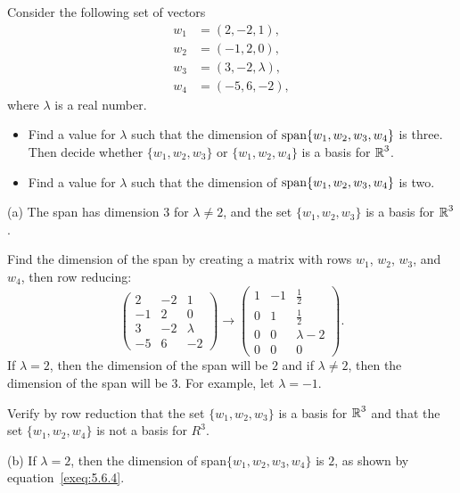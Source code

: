 \documentclass{ximera}
\begin{document}
\begin{exercise} \label{c5.6.4}
Consider the following set of vectors
\begin{align*}
w_1 &= (2, -2, 1), \\
w_2 &= (-1, 2, 0), \\
w_3 &= (3, -2, \lambda), \\
w_4 &= (-5, 6, -2),
\end{align*}
where $\lambda$ is a real number.
\begin{itemize}
\item[(a)] Find a value for $\lambda$ such that the
dimension of ${\rm span}\{w_1,w_2,w_3,w_4\}$ is three. Then decide
whether $\{w_1,w_2,w_3\}$ or $\{w_1,w_2,w_4\}$ is a basis for
$\mbox{$\Bbb{R}$}^3$.
\item[(b)] Find a value for $\lambda$ such that the
dimension of ${\rm span}\{w_1,w_2,w_3,w_4\}$ is two.
\end{itemize}

\begin{solution}

(a) \ans The span has dimension $3$ for $\lambda \neq 2$, and 
the set $\{w_1,w_2,w_3\}$ is a basis for $\mbox{$\Bbb{R}$}^3$.

\soln Find the dimension of the span by creating a matrix with rows
$w_1$, $w_2$, $w_3$, and $w_4$, then row reducing:
\begin{equation} \label{exeq:5.6.4}
\left(\begin{array}{rrr} 2 & -2 & 1 \\ -1 & 2 & 0 \\ 3 & -2 &
\lambda \\ -5 & 6 & -2 \end{array}\right) \longrightarrow
\left(\begin{array}{rrc} 1 & -1 & \frac{1}{2} \\ 0 & 1 & \frac{1}{2}
\\ 0 & 0 & \lambda - 2 \\ 0 & 0 & 0 \end{array}\right).
\end{equation}
If $\lambda = 2$, then the dimension of the span will
be $2$ and if $\lambda \neq 2$, then the dimension of the span
will be $3$.  For example, let $\lambda = -1$.

\para Verify by row reduction that the set $\{w_1,w_2,w_3\}$ is a basis
for $\mbox{$\Bbb{R}$}^3$ and that the set $\{w_1,w_2,w_4\}$ is not a basis for $R^3$. 

(b) If $\lambda = 2$, then the dimension of span$\{w_1,w_2,w_3,w_4\}$
is $2$, as shown by equation~\eqref{exeq:5.6.4}.



\end{solution}
\end{exercise}
\end{document}
